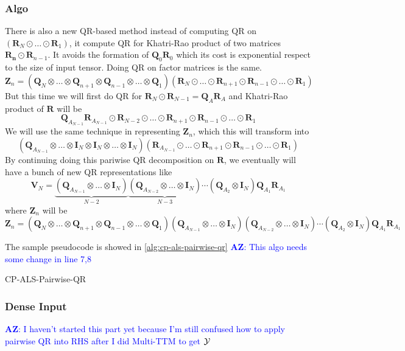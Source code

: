 \documentclass{article}
\newcommand{\mat}[1]{\mathbf{#1}}
\newcommand{\T}[2][]{#1{\mathbf{\cal{#2}}}} 						%
\newcommand{\AZ}[1]{\textcolor{blue}{\textbf{AZ}: #1}}
\begin{document}
\subsubsection{Algo}
There is also a new QR-based method instead of computing QR on $(\mat{R}_N \odot \dots \odot \mat{R}_1)$, it compute QR for Khatri-Rao product of two matrices $\mat{R_n} \odot \mat{R}_{n-1}$.
It avoids the formation of $\mat{Q}_0\mat{R}_0$ which its cost is exponential respect to the size of input tensor.
Doing QR on factor matrices is the same.
$$\mat{Z}_n = (\mat{Q}_N \otimes \dots \otimes \mat{Q}_{n+1} \otimes \mat{Q}_{n-1} \otimes \dots \otimes \mat{Q}_1)(\mat{R}_N \odot \dots \odot \mat{R}_{n+1} \odot \mat{R}_{n-1} \odot \dots \odot \mat{R}_1)$$
But this time we will first do QR for $\mat{R}_N \odot \mat{R}_{N-1} = \mat{Q}_{A}\mat{R}_A$ and Khatri-Rao product of $\mat{R}$ will be 
$$\mat{Q}_{A_{N-1}}\mat{R}_{A_{N-1}} \odot \mat{R}_{N-2} \odot \dots \odot \mat{R}_{n+1} \odot \mat{R}_{n-1} \odot \dots \odot \mat{R}_1$$
We will use the same technique in representing $\mat{Z}_n$, which this will transform into 
$$(\mat{Q}_{A_{N-1}} \otimes \dots \otimes \mat{I}_N \otimes \mat{I}_N \otimes \dots  \otimes  \mat{I}_N)(\mat{R}_{A_{N-1}} \odot \dots \odot \mat{R}_{n+1} \odot \mat{R}_{n-1} \odot \dots \odot \mat{R}_1)$$
By continuing doing this pariwise QR decomposition on $\mat{R}$, we eventually will have a bunch of new QR representations like
$$\mat{V}_N = \underbrace{(\mat{Q}_{A_{N-1}} \otimes \dots  \otimes  \mat{I}_N)}_{N-2}\underbrace{(\mat{Q}_{A_{N-2}} \otimes \dots \otimes \mat{I}_N)}_{N-3} \cdots (\mat{Q}_{A_{2}} \otimes \mat{I}_N) \mat{Q}_{A_{1}}\mat{R}_{A_{1}}$$
where $\mat{Z}_n$ will be 
$$\mat{Z}_n = (\mat{Q}_N \otimes \dots \otimes \mat{Q}_{n+1} \otimes \mat{Q}_{n-1} \otimes \dots \otimes \mat{Q}_1) (\mat{Q}_{A_{N-1}} \otimes \dots  \otimes  \mat{I}_N)(\mat{Q}_{A_{N-2}} \otimes \dots \otimes \mat{I}_N) \cdots (\mat{Q}_{A_{2}} \otimes \mat{I}_N) \mat{Q}_{A_{1}}\mat{R}_{A_{1}}$$

The sample pseudocode is showed in \cref{alg:cp-als-pairwise-qr} \AZ{This algo needs some change in line 7,8}
\begin{algorithm}
  \caption{CP-ALS-Pairwise-QR}
  \label{alg:cp-als-pairwise-qr}
  
\end{algorithm}
\subsubsection{Dense Input}
\AZ{I haven't started this part yet because I'm still confused how to apply pairwise QR into RHS after I did Multi-TTM to get $\T[]{Y}$}
\end{document}
